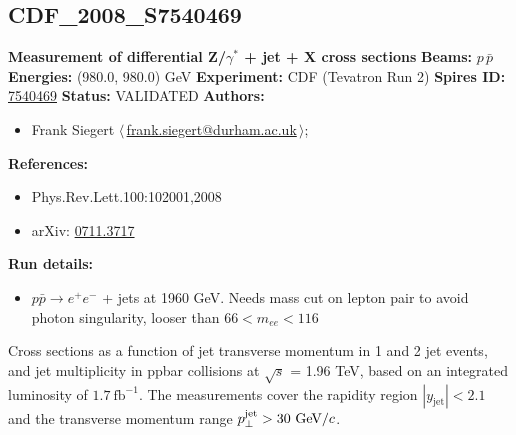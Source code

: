 \clearpage


\clearpage

\subsection[CDF\_2008\_S7540469]{CDF\_2008\_S7540469\,\cite{:2007cp}}
\textbf{Measurement of differential Z/$\gamma^*$ + jet + X cross sections}\newline
\textbf{Beams:} $p$\,$\bar{p}$ \newline
\textbf{Energies:} (980.0, 980.0) GeV \newline
\textbf{Experiment:} CDF (Tevatron Run 2) \newline
\textbf{Spires ID:} \href{http://www.slac.stanford.edu/spires/find/hep/www?rawcmd=key+7540469}{7540469}\newline
\textbf{Status:} VALIDATED\newline
\textbf{Authors:}
\begin{itemize}
  \item Frank Siegert $\langle\,$\href{mailto:frank.siegert@durham.ac.uk}{frank.siegert@durham.ac.uk}$\,\rangle$;
\end{itemize}
\textbf{References:}
\begin{itemize}
  \item Phys.Rev.Lett.100:102001,2008
  \item arXiv: \href{http://arxiv.org/abs/0711.3717}{0711.3717}
\end{itemize}
\textbf{Run details:}
\begin{itemize}

  \item $p \bar{p} \to e^+ e^-$ + jets at 1960 GeV. Needs mass cut on lepton pair to avoid photon singularity, looser than $66 < m_{ee} < 116$\end{itemize}

\noindent Cross sections as a function of jet transverse momentum in 1 and 2 jet events, and jet multiplicity in ppbar collisions at \ensuremath{\sqrt{s}} = 1.96 TeV, based on an integrated luminosity of $1.7~\text{fb}^{-1}$. The measurements cover the rapidity region $|y_\text{jet}| < 2.1$ and the transverse momentum range $p_\perp^\text{jet} > 30~\text{GeV}/c$.

\clearpage


\clearpage

